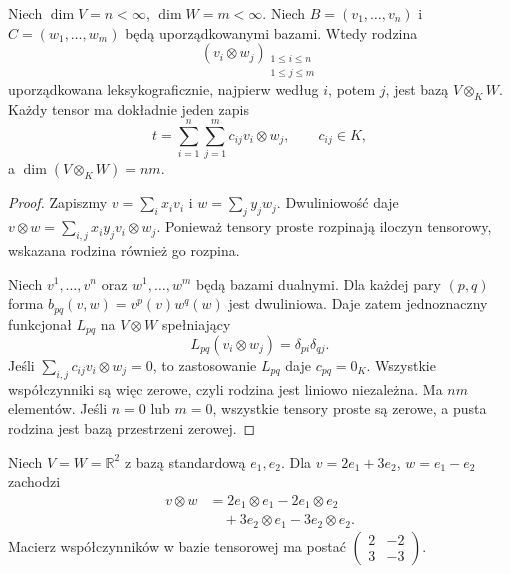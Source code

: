 \begin{twierdzenie}
\label{thm:lin9-baza}
Niech \(\dim V=n<\infty\),
\(\dim W=m<\infty\).
Niech \(B=(v_1,\ldots,v_n)\)
i \(C=(w_1,\ldots,w_m)\)
będą uporządkowanymi bazami.
Wtedy rodzina
\[
 (v_i\otimes w_j)_{\substack{
 1\leq i\leq n\\1\leq j\leq m}}
\]
uporządkowana leksykograficznie,
najpierw według \(i\), potem \(j\),
jest bazą \(V\otimes_KW\).
Każdy tensor ma dokładnie jeden zapis
\[
 t=\sum_{i=1}^n\sum_{j=1}^m
   c_{ij}v_i\otimes w_j,\qquad c_{ij}\in K,
\]
a \(\dim(V\otimes_KW)=nm\).
\end{twierdzenie}
\begin{proof}
Zapiszmy
\(v=\sum_i x_iv_i\) i
\(w=\sum_j y_jw_j\).
Dwuliniowość daje
\(v\otimes w=\sum_{i,j}
x_iy_jv_i\otimes w_j\).
Ponieważ tensory proste rozpinają
iloczyn tensorowy, wskazana rodzina
również go rozpina.

Niech \(v^1,\ldots,v^n\)
oraz \(w^1,\ldots,w^m\)
będą bazami dualnymi.
Dla każdej pary \((p,q)\)
forma
\(b_{pq}(v,w)=v^p(v)w^q(w)\)
jest dwuliniowa.
Daje zatem jednoznaczny
funkcjonał \(L_{pq}\) na
\(V\otimes W\) spełniający
\[
 L_{pq}(v_i\otimes w_j)
 =\delta_{pi}\delta_{qj}.
\]
Jeśli
\(\sum_{i,j}c_{ij}v_i\otimes w_j=0\),
to zastosowanie \(L_{pq}\)
daje \(c_{pq}=0_K\).
Wszystkie współczynniki
są więc zerowe, czyli
rodzina jest liniowo niezależna.
Ma \(nm\) elementów.
Jeśli \(n=0\) lub \(m=0\),
wszystkie tensory proste są zerowe,
a pusta rodzina jest bazą
przestrzeni zerowej.
\end{proof}

\begin{przyklad}
\label{prz:lin9-wspolrzedne}
Niech \(V=W=\mathbb R^2\)
z bazą standardową \(e_1,e_2\).
Dla \(v=2e_1+3e_2\),
\(w=e_1-e_2\) zachodzi
\[
 \begin{aligned}
 v\otimes w
 &=2e_1\otimes e_1-2e_1\otimes e_2\\
 &\quad+3e_2\otimes e_1-3e_2\otimes e_2.
 \end{aligned}
\]
Macierz współczynników
w bazie tensorowej ma postać
\(\begin{pmatrix}2&-2\\3&-3\end{pmatrix}\).
\end{przyklad}

